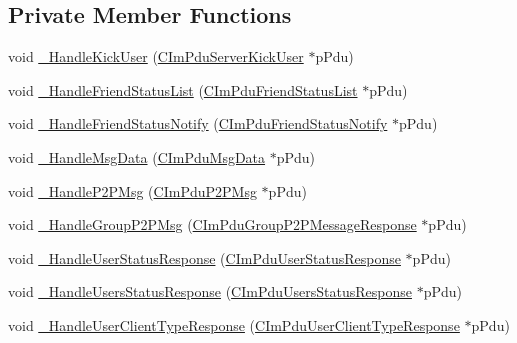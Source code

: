 \subsection*{Private Member Functions}
\begin{DoxyCompactItemize}
\item 
void \hyperlink{class_c_route_serv_conn_a43657a251b0907368bbeb741ec0e3fd6}{\+\_\+\+Handle\+Kick\+User} (\hyperlink{class_c_im_pdu_server_kick_user}{C\+Im\+Pdu\+Server\+Kick\+User} $\ast$p\+Pdu)
\item 
void \hyperlink{class_c_route_serv_conn_a912a02b54b8403db758a3aed943e4c96}{\+\_\+\+Handle\+Friend\+Status\+List} (\hyperlink{class_c_im_pdu_friend_status_list}{C\+Im\+Pdu\+Friend\+Status\+List} $\ast$p\+Pdu)
\item 
void \hyperlink{class_c_route_serv_conn_a219bc085d39971870da8a028d6557828}{\+\_\+\+Handle\+Friend\+Status\+Notify} (\hyperlink{class_c_im_pdu_friend_status_notify}{C\+Im\+Pdu\+Friend\+Status\+Notify} $\ast$p\+Pdu)
\item 
void \hyperlink{class_c_route_serv_conn_aa3902b6a6acd784727d144fd17c4be0c}{\+\_\+\+Handle\+Msg\+Data} (\hyperlink{class_c_im_pdu_msg_data}{C\+Im\+Pdu\+Msg\+Data} $\ast$p\+Pdu)
\item 
void \hyperlink{class_c_route_serv_conn_a0773f5004710bf6cdb712c56f669f0f7}{\+\_\+\+Handle\+P2\+P\+Msg} (\hyperlink{class_c_im_pdu_p2_p_msg}{C\+Im\+Pdu\+P2\+P\+Msg} $\ast$p\+Pdu)
\item 
void \hyperlink{class_c_route_serv_conn_a309de46350ca91c53abac0646f9b3ec8}{\+\_\+\+Handle\+Group\+P2\+P\+Msg} (\hyperlink{class_c_im_pdu_group_p2_p_message_response}{C\+Im\+Pdu\+Group\+P2\+P\+Message\+Response} $\ast$p\+Pdu)
\item 
void \hyperlink{class_c_route_serv_conn_a3d21d141e38fb3fda533f5d11f797f96}{\+\_\+\+Handle\+User\+Status\+Response} (\hyperlink{class_c_im_pdu_user_status_response}{C\+Im\+Pdu\+User\+Status\+Response} $\ast$p\+Pdu)
\item 
void \hyperlink{class_c_route_serv_conn_a084c544a173ef262ad2fec305b1e5c04}{\+\_\+\+Handle\+Users\+Status\+Response} (\hyperlink{class_c_im_pdu_users_status_response}{C\+Im\+Pdu\+Users\+Status\+Response} $\ast$p\+Pdu)
\item 
void \hyperlink{class_c_route_serv_conn_aa9da59d5e2f1177298a897ce2514861c}{\+\_\+\+Handle\+User\+Client\+Type\+Response} (\hyperlink{class_c_im_pdu_user_client_type_response}{C\+Im\+Pdu\+User\+Client\+Type\+Response} $\ast$p\+Pdu)
\end{DoxyCompactItemize}
